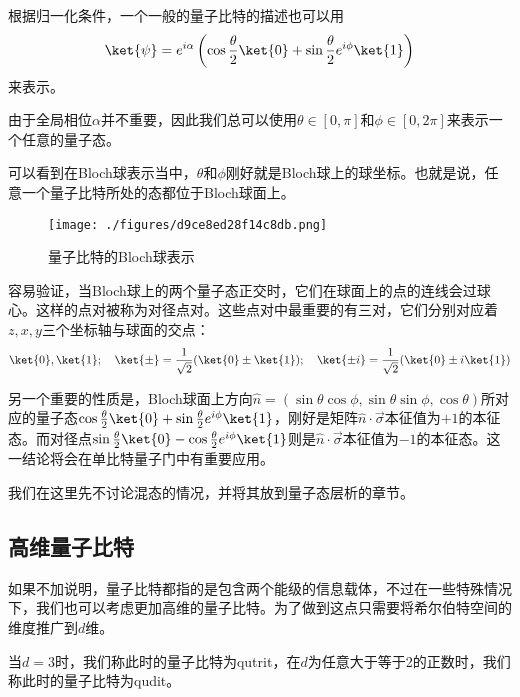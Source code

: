 根据归一化条件，一个一般的量子比特的描述也可以用
\begin{equation}
\ket{\psi}=e^{i\alpha}\left(\cos\frac{\theta}{2}\ket{0}+\sin\frac{\theta}{2}e^{i\phi}\ket{1}\right)
\end{equation}
来表示。

由于全局相位$\alpha$并不重要，因此我们总可以使用$\theta\in[0,\pi]$和$\phi\in[0,2\pi]$来表示一个任意的量子态。

可以看到在Bloch球表示当中，$\theta$和$\phi$刚好就是Bloch球上的球坐标。也就是说，任意一个量子比特所处的态都位于Bloch球面上。

\begin{figure}[ht]
\centering
\texttt{[image: ./figures/d9ce8ed28f14c8db.png]}
\caption{量子比特的Bloch球表示} \label{fig_Qubit}
\end{figure}

容易验证，当Bloch球上的两个量子态正交时，它们在球面上的点的连线会过球心。这样的点对被称为对径点对。这些点对中最重要的有三对，它们分别对应着$z,x,y$三个坐标轴与球面的交点：
\begin{equation}
\ket{0},\ket{1};\quad \ket{\pm}=\frac{1}{\sqrt{2}}(\ket{0}\pm\ket{1});\quad \ket{\pm i}=\frac{1}{\sqrt{2}}(\ket{0}\pm i\ket{1})
\end{equation}

另一个重要的性质是，Bloch球面上方向$\hat{n}=(\sin\theta\cos\phi,\sin\theta\sin\phi,\cos\theta)$所对应的量子态$\cos\frac{\theta}{2}\ket{0}+\sin\frac{\theta}{2}e^{i\phi}\ket{1}$，刚好是矩阵$\hat{n}\cdot\vec{\sigma}$本征值为$+1$的本征态。而对径点$\sin\frac{\theta}{2}\ket{0}-\cos\frac{\theta}{2}e^{i\phi}\ket{1}$则是$\hat{n}\cdot\vec{\sigma}$本征值为$-1$的本征态。这一结论将会在单比特量子门中有重要应用。

我们在这里先不讨论混态的情况，并将其放到量子态层析的章节。

\subsection{高维量子比特}

如果不加说明，量子比特都指的是包含两个能级的信息载体，不过在一些特殊情况下，我们也可以考虑更加高维的量子比特。为了做到这点只需要将希尔伯特空间的维度推广到$d$维。

当$d=3$时，我们称此时的量子比特为qutrit，在$d$为任意大于等于2的正数时，我们称此时的量子比特为qudit。